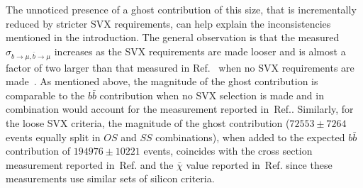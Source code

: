 \documentclass[aps,prd,preprint,floatfix,nofootinbib,superscriptaddress,showpacs,amssymb]{revtex4}
\begin{document}
 The unnoticed presence of a ghost contribution of this size, that is
 incrementally reduced by stricter SVX requirements, can help explain
 the inconsistencies mentioned in the introduction. The general
 observation is that the measured
 $\sigma_{b\rightarrow\mu,\bar{b}\rightarrow \mu}$ increases as
 the SVX requirements are made looser and is almost a factor of two
 larger than that measured in Ref.~\cite{bbxs} when no SVX requirements
 are made~\cite{d0b2}. As mentioned above, the magnitude of the ghost
 contribution is comparable to the $b\bar{b}$ contribution when no 
 SVX selection is made and in combination would account for the
 measurement reported in~Ref.\cite{d0b2}. Similarly, for the loose SVX 
 criteria, the magnitude of the ghost contribution ($72553\pm 7264$ events
 equally split in $OS$ and $SS$ combinations), when added to
 the expected $b\bar{b}$ contribution of $194976 \pm 10221$ events,
 coincides with the cross section measurement reported in~Ref.\cite{2mucdf}
 and the $\bar{\chi}$ value reported in~Ref.\cite {bmix} since these
 measurements use similar sets of silicon criteria. 
\end{document}
